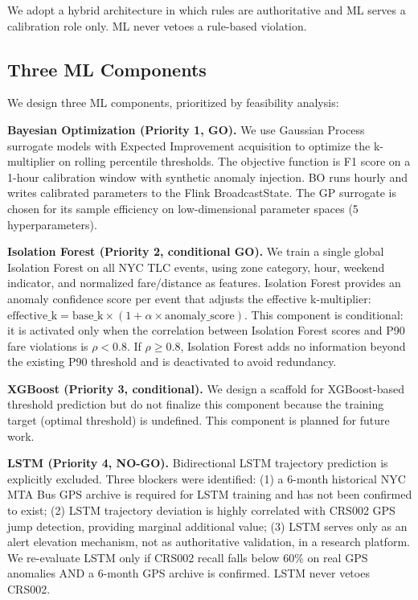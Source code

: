 We adopt a hybrid architecture in which rules are authoritative and ML
serves a calibration role only. ML never vetoes a rule-based violation.

\subsection{Three ML Components}

We design three ML components, prioritized by feasibility analysis:

\textbf{Bayesian Optimization (Priority 1, GO).} We use Gaussian Process
surrogate models with Expected Improvement acquisition to optimize the
k-multiplier on rolling percentile thresholds. The objective function is
F1 score on a 1-hour calibration window with synthetic anomaly injection.
BO runs hourly and writes calibrated parameters to the Flink BroadcastState.
The GP surrogate is chosen for its sample efficiency on low-dimensional
parameter spaces (5 hyperparameters). \citep{bayesianopt2012}

\textbf{Isolation Forest (Priority 2, conditional GO).} We train a single
global Isolation Forest \citep{iforest2008} on all NYC TLC events,
using zone category, hour, weekend indicator, and normalized fare/distance
as features. Isolation Forest provides an anomaly confidence score per event
that adjusts the effective k-multiplier: $\text{effective\_k} =
\text{base\_k} \times (1 + \alpha \times \text{anomaly\_score})$.
This component is conditional: it is activated only when the correlation
between Isolation Forest scores and P90 fare violations is $\rho < 0.8$.
If $\rho \geq 0.8$, Isolation Forest adds no information beyond the
existing P90 threshold and is deactivated to avoid redundancy.

\textbf{XGBoost (Priority 3, conditional).} We design a scaffold for
XGBoost-based threshold prediction but do not finalize this component
because the training target (optimal threshold) is undefined. This
component is planned for future work.

\textbf{LSTM (Priority 4, NO-GO).} Bidirectional LSTM trajectory prediction
\citep{cetrajad2025} is explicitly excluded. Three blockers were identified:
(1) a 6-month historical NYC MTA Bus GPS archive is required for LSTM
training and has not been confirmed to exist; (2) LSTM trajectory deviation
is highly correlated with CRS002 GPS jump detection, providing marginal
additional value; (3) LSTM serves only as an alert elevation mechanism,
not as authoritative validation, in a research platform. We re-evaluate
LSTM only if CRS002 recall falls below 60\% on real GPS anomalies AND
a 6-month GPS archive is confirmed. LSTM never vetoes CRS002.

